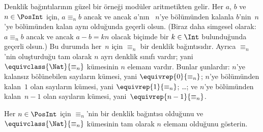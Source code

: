 \begin{ex}
Denklik bağıntılarının güzel bir örneği modüler aritmetikten gelir. Her
$a$, $b$ ve $n \in \PosInt$ için, $a \equiv_n b$ ancak ve ancak $a$'nın
~$n$'ye bölümünden kalanla $b$'nin~$n$'ye bölümünden kalan aynı olduğunda
geçerli olsun. (Biraz daha simgesel olarak: $a \equiv_n b$ ancak ve ancak
$a-b=kn$ olacak biçimde bir $k \in \Int$ bulunduğunda geçerli olsun.) Bu
durumda her~$n$ için $\equiv_n$ bir denklik
bağıntısıdır. Ayrıca $\equiv_n$'nin oluşturduğu tam olarak $n$ ayrı denklik
sınıfı vardır; yani $\equivclass{\Nat}{\equiv_n}$ kümesinin $n$ elemanı vardır.
Bunlar şunlardır: $n$'ye kalansız bölünebilen sayıların kümesi, yani
$\equivrep{0}{\equiv_n}$; $n$'ye bölümünden kalan~$1$ olan sayıların kümesi,
yani $\equivrep{1}{\equiv_n}$; \ldots; ve $n$'ye bölümünden kalan~$n-1$ olan
sayıların kümesi, yani~$\equivrep{n-1}{\equiv_n}$.
\end{ex}

\begin{prob}
Her $n \in \PosInt$ için $\equiv_n$'nin bir denklik bağıntısı olduğunu ve
$\equivclass{\Nat}{\equiv_n}$ kümesinin tam olarak $n$ elemanı olduğunu
gösterin.
\end{prob}

